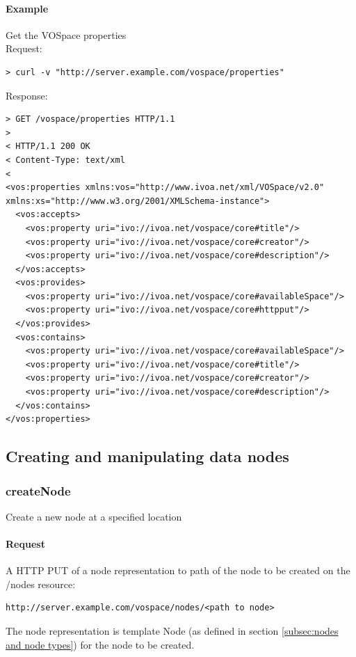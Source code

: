 \documentclass[11pt,a4paper]{ivoa}
\begin{document}
\paragraph{Example}
Get the VOSpace properties
\\[5px]
\noindent
Request:
\begin{lstlisting}
> curl -v "http://server.example.com/vospace/properties"
\end{lstlisting}
Response:
\begin{lstlisting}
> GET /vospace/properties HTTP/1.1
>
< HTTP/1.1 200 OK
< Content-Type: text/xml
<
<vos:properties xmlns:vos="http://www.ivoa.net/xml/VOSpace/v2.0" xmlns:xs="http://www.w3.org/2001/XMLSchema-instance">
  <vos:accepts>
    <vos:property uri="ivo://ivoa.net/vospace/core#title"/>
    <vos:property uri="ivo://ivoa.net/vospace/core#creator"/>
    <vos:property uri="ivo://ivoa.net/vospace/core#description"/>
  </vos:accepts>
  <vos:provides>
    <vos:property uri="ivo://ivoa.net/vospace/core#availableSpace"/>
    <vos:property uri="ivo://ivoa.net/vospace/core#httpput"/>
  </vos:provides>
  <vos:contains>
    <vos:property uri="ivo://ivoa.net/vospace/core#availableSpace"/>
    <vos:property uri="ivo://ivoa.net/vospace/core#title"/>
    <vos:property uri="ivo://ivoa.net/vospace/core#creator"/>
    <vos:property uri="ivo://ivoa.net/vospace/core#description"/>
  </vos:contains>
</vos:properties>
\end{lstlisting}

\subsection{Creating and manipulating data nodes}
\label{subsec:creating and manipulating data nodes}

\subsubsection{createNode}
\label{subsubsec:createnode}
Create a new node at a specified location

\paragraph{Request}
A HTTP PUT of a node representation to path of the node to be created on the /nodes resource:
\begin{verbatim}
http://server.example.com/vospace/nodes/<path to node>
\end{verbatim}
The node representation is template Node (as defined in section \ref{subsec:nodes and node types}) for the node to be created.
\end{document}
